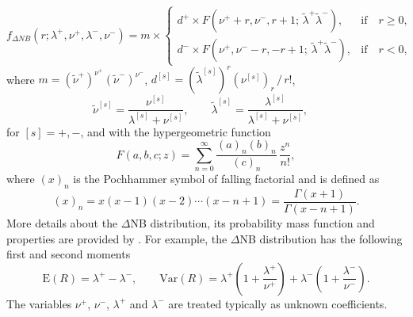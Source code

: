 \documentclass[12pt]{article}
\begin{document}
\begin{equation}
f_{\Delta NB}(r; \lambda^{+}, \nu^{+} ,\lambda^{-}, \nu^{-})= m \times
\begin{cases}
d^{+} \times F\left(\nu^{+}+r, \nu^{-}, r+1; \, \tilde{\lambda}^{+}\tilde{\lambda}^{-}\right), & \text{if} \quad r \geq 0 ,\\
d^{-} \times F\left(\nu^{+}, \nu^{-}-r, -r+1;\, \tilde{\lambda}^{+}\tilde{\lambda}^{-}\right), & \text{if}  \quad r < 0 , \nonumber
\end{cases}
\end{equation}
where
$m = \left(\tilde{\nu}^{+}\right)^{\nu^{+}}\left(\tilde{\nu}^{-}\right)^{\nu^{-}}$,
$d^{[s]} = (\tilde{\lambda}^{[s]})^r (\nu^{[s]})_{r}\, / \, r!$,
\[
\tilde{\nu}^{[s]} = \frac{\nu^{[s]}}{ \lambda^{[s]}+\nu^{[s]}} , \qquad
\tilde{\lambda}^{[s]} = \frac{\lambda^{[s]}}{ \lambda^{[s]}+\nu^{[s]}} , \quad
\]
for $[s]=+,-$,
and with the hypergeometric function 
\[
F(a, b, c; z) =
\sum \limits_{n=0}^{\infty}
\frac{ (a)_{n} (b)_{n}}{(c)_{n}} \, \frac{z^n}{n!} ,
\]
where $(x)_{n}$ is the Pochhammer symbol of falling factorial
and is defined as
\begin{equation}
(x)_{n} =x (x-1)(x-2) \cdots(x-n+1)=\frac{\Gamma(x+1)}{\Gamma(x-n+1)}.
\end{equation}
More details about the $\Delta$NB distribution, its probability mass
function and properties are provided by \citet{BNPollardShephard2012}.
For example,
the $\Delta$NB distribution has the following first and second moments
\begin{equation}
\textrm{E}(R)= \lambda^{+} -\lambda^{-} ,  \qquad
\textrm{Var}(R)= \lambda^{+} \left(1+\frac{\lambda^{+}}{\nu^{+}}\right)+\lambda^{-} \left(1+\frac{\lambda^{-}}{\nu^{-}}\right).
\end{equation}
%
The variables $\nu ^{+}$, $\nu ^{-}$, $\lambda ^{+}$ and
$\lambda ^{-}$ are treated typically as unknown coefficients.
\end{document}
